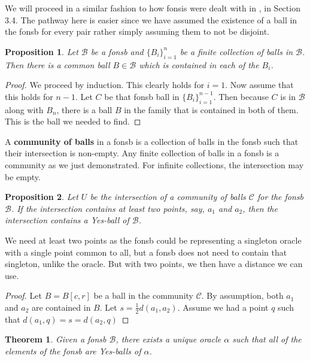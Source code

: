 \documentclass[12pt]{article}
\newtheorem{theorem}{Theorem}[section]
\newtheorem{proposition}{Proposition}[section]
\begin{document}
We will proceed in a similar fashion to how fonsis were dealt with in \cite{taylor23main}, in Section 3.4. The pathway here is easier since we have assumed the existence of a ball in the fonsb for every pair rather simply assuming them to not be disjoint. 

\begin{proposition}
    Let $\mathcal{B}$ be a fonsb and $\{B_i\}_{i=1}^n$ be a finite collection of balls in $\mathcal{B}$. Then there is a common ball $B \in \mathcal{B}$ which is contained in each of the $B_i$.
\end{proposition}

\begin{proof}
    We proceed by induction. This clearly holds for $i=1$. Now assume that this holds for $n-1$. Let $C$ be that fonsb ball in $\{B_i\}_{i=1}^{n-1}$. Then because $C$ is in $\mathcal{B}$ along with $B_n$, there is a ball $B$ in the family that is contained in both of them. This is the ball we needed to find. 
\end{proof}

A \textbf{community of balls} in a fonsb is a collection of balls in the fonsb such that their intersection is non-empty. Any finite collection of balls in a fonsb is a community as we just demonstrated. For infinite collections, the intersection may be empty. 

\begin{proposition}
Let $U$ be the intersection of a community of balls $\mathcal{C}$ for the fonsb $\mathcal{B}$. If the intersection contains at least two points, say, $a_1$ and $a_2$, then the intersection contains a Yes-ball of $\mathcal{B}$.
\end{proposition}

We need at least two points as the fonsb could be representing a singleton oracle with a single point common to all, but a fonsb does not need to contain that singleton, unlike the oracle. But with two points, we then have a distance we can use. 

\begin{proof}
Let $B = B[c,r]$ be a ball in the community $\mathcal{C}$. By assumption, both $a_1$ and $a_2$ are contained in $B$. Let $s = \frac{1}{2}d(a_1, a_2)$. Assume we had a point $q$ such that $d(a_1, q)= s = d(a_2, q)$ 
\end{proof}




\begin{theorem}
    Given a fonsb $\mathcal{B}$, there exists a unique oracle $\alpha$ such that all of the elements of the fonsb are Yes-balls of $\alpha$.
\end{theorem}
\end{document}
